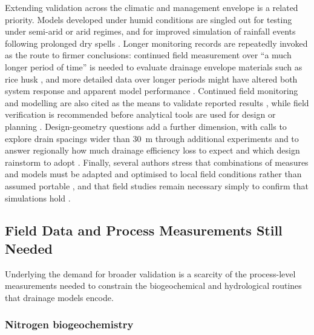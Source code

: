 \documentclass[11pt]{article}
\begin{document}
Extending validation across the climatic and management envelope is a related priority. Models developed under humid conditions are singled out for testing under semi-arid or arid regimes, and for improved simulation of rainfall events following prolonged dry spells \parencite{Prasher1996}. Longer monitoring records are repeatedly invoked as the route to firmer conclusions: continued field measurement over ``a much longer period of time'' is needed to evaluate drainage envelope materials such as rice husk \parencite{Ebrahimian2011}, and more detailed data over longer periods might have altered both system response and apparent model performance \parencite{Negm2017}. Continued field monitoring and modelling are also cited as the means to validate reported results \parencite{Grazhdani1996}, while field verification is recommended before analytical tools are used for design or planning \parencite{Hornbuckle2012}. Design-geometry questions add a further dimension, with calls to explore drain spacings wider than 30~m through additional experiments \parencite{Mathew2001} and to answer regionally how much drainage efficiency loss to expect and which design rainstorm to adopt \parencite{Wiskow2003}. Finally, several authors stress that combinations of measures and models must be adapted and optimised to local field conditions rather than assumed portable \parencite{MULLER1988}, and that field studies remain necessary simply to confirm that simulations hold \parencite{Shipitalo2016,Yousfi2014}.

\subsection{Field Data and Process Measurements Still Needed}

Underlying the demand for broader validation is a scarcity of the process-level measurements needed to constrain the biogeochemical and hydrological routines that drainage models encode.

\subsubsection{Nitrogen biogeochemistry}
\end{document}
